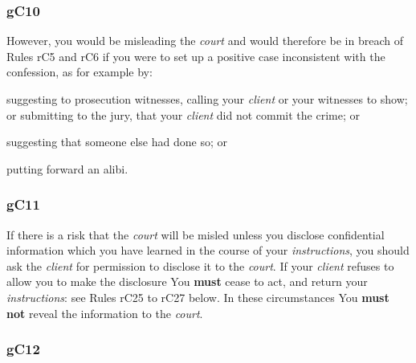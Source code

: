 \subsubsection{\color{darkgrey}gC10}

However, you would be misleading the \emph{court} and would therefore be
in breach of Rules rC5 and rC6 if you were to set up a positive case
inconsistent with the confession, as for example by:
\begin{numlist}\item suggesting to prosecution witnesses, calling your \emph{client} or
your witnesses to show; or submitting to the jury, that your
\emph{client} did not commit the crime; or
\item suggesting that someone else had done so; or
\item putting forward an alibi.
\end{numlist}

\subsubsection{\color{darkgrey}gC11}

If there is a risk that the \emph{court} will be misled unless you
disclose confidential information which you have learned in the course
of your \emph{instructions}, you should ask the \emph{client} for
permission to disclose it to the \emph{court}. If your \emph{client}
refuses to allow you to make the disclosure You \textcolor{myred}{\textbf{must}} cease to act, and
return your \emph{instructions}: see Rules rC25 to rC27 below. In these
circumstances You \textcolor{myred}{\textbf{must not}} reveal the information to the \emph{court}.

\subsubsection{\color{darkgrey}gC12}

